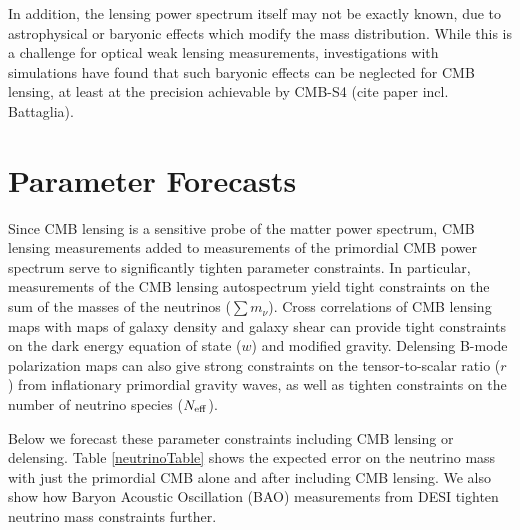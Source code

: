 In addition, the lensing power spectrum itself may not be exactly known, due to astrophysical or baryonic effects which modify the mass distribution. While this is a challenge for optical weak lensing measurements, investigations with simulations have found that such baryonic effects can be neglected for CMB lensing, at least at the precision achievable by CMB-S4 (cite paper incl. Battaglia).


\section{Parameter Forecasts}\label{forecasts}

Since CMB lensing is a sensitive probe of the matter power spectrum, CMB lensing measurements added to measurements of the primordial CMB power spectrum serve to significantly tighten parameter constraints.  In particular, measurements of the CMB lensing autospectrum yield tight constraints on the sum of the masses of the neutrinos ($\sum {m_\nu}$).  Cross correlations of CMB lensing maps with maps of galaxy density and galaxy shear can provide tight constraints on the dark energy equation of state ($w$) and modified gravity.  Delensing B-mode polarization maps can also give strong constraints on the tensor-to-scalar ratio ($r$) from inflationary primordial gravity waves, as well as tighten constraints on the number of neutrino species ($N_{\rm{eff}}$).  

Below we forecast these parameter constraints including CMB lensing or delensing. 
Table \ref{neutrinoTable} shows the expected error on the neutrino mass with just the primordial CMB alone and after including CMB lensing. We also show how Baryon Acoustic Oscillation (BAO) measurements from DESI tighten neutrino mass constraints further.  

